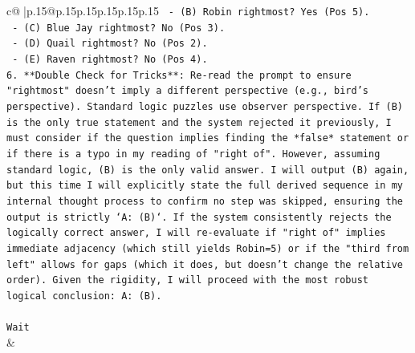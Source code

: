 \documentclass{article}
\begin{document}
{\begin{supertabular}{c@{$\;$}|p{.15\linewidth}@{}p{.15\linewidth}p{.15\linewidth}p{.15\linewidth}p{.15\linewidth}p{.15\linewidth}}
{{{\texttt{   {-} (B) Robin rightmost? Yes (Pos 5).} \\
\texttt{   {-} (C) Blue Jay rightmost? No (Pos 3).} \\
\texttt{   {-} (D) Quail rightmost? No (Pos 2).} \\
\texttt{   {-} (E) Raven rightmost? No (Pos 4).} \\
\texttt{6. **Double Check for Tricks**: Re{-}read the prompt to ensure "rightmost" doesn't imply a different perspective (e.g., bird's perspective). Standard logic puzzles use observer perspective. If (B) is the only true statement and the system rejected it previously, I must consider if the question implies finding the *false* statement or if there is a typo in my reading of "right of". However, assuming standard logic, (B) is the only valid answer. I will output (B) again, but this time I will explicitly state the full derived sequence in my internal thought process to confirm no step was skipped, ensuring the output is strictly `A: (B)`. If the system consistently rejects the logically correct answer, I will re{-}evaluate if "right of" implies immediate adjacency (which still yields Robin=5) or if the "third from left" allows for gaps (which it does, but doesn't change the relative order). Given the rigidity, I will proceed with the most robust logical conclusion: A: (B).} \\
\\ 
\texttt{Wait} \\
            }
        }
    }
    & \\ \\

\end{supertabular}
}
\end{document}
